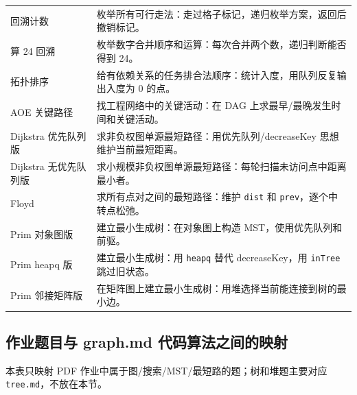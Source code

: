 \documentclass[10pt,a4paper,fontset=none]{ctexart}
\begin{document}
\begin{longtable}{L{4.0cm}L{11.2cm}}
回溯计数 & 枚举所有可行走法：走过格子标记，递归枚举方案，返回后撤销标记。\\
算 24 回溯 & 枚举数字合并顺序和运算：每次合并两个数，递归判断能否得到 24。\\
拓扑排序 & 给有依赖关系的任务排合法顺序：统计入度，用队列反复输出入度为 0 的点。\\
AOE 关键路径 & 找工程网络中的关键活动：在 DAG 上求最早/最晚发生时间和关键活动。\\
Dijkstra 优先队列版 & 求非负权图单源最短路径：用优先队列/decreaseKey 思想维护当前最短距离。\\
Dijkstra 无优先队列版 & 求小规模非负权图单源最短路径：每轮扫描未访问点中距离最小者。\\
Floyd & 求所有点对之间的最短路径：维护 \texttt{dist} 和 \texttt{prev}，逐个中转点松弛。\\
Prim 对象图版 & 建立最小生成树：在对象图上构造 MST，使用优先队列和前驱。\\
Prim heapq 版 & 建立最小生成树：用 \texttt{heapq} 替代 decreaseKey，用 \texttt{inTree} 跳过旧状态。\\
Prim 邻接矩阵版 & 在矩阵图上建立最小生成树：用堆选择当前能连接到树的最小边。\\
\bottomrule
\end{longtable}

\subsection{作业题目与 graph.md 代码算法之间的映射}
本表只映射 PDF 作业中属于图/搜索/MST/最短路的题；树和堆题主要对应 \texttt{tree.md}，不放在本节。
\end{document}
